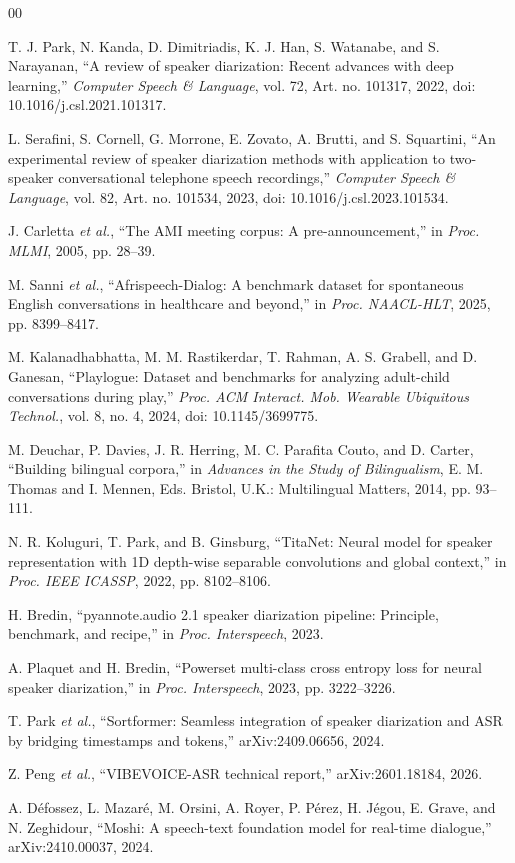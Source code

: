\documentclass[conference,onecolumn]{IEEEtran}
\begin{document}
\begin{thebibliography}{00}

T. J. Park, N. Kanda, D. Dimitriadis, K. J. Han, S. Watanabe, and S. Narayanan,
``A review of speaker diarization: Recent advances with deep learning,''
\emph{Computer Speech \& Language}, vol. 72, Art. no. 101317, 2022,
doi: 10.1016/j.csl.2021.101317.

L. Serafini, S. Cornell, G. Morrone, E. Zovato, A. Brutti, and S. Squartini,
``An experimental review of speaker diarization methods with application to
two-speaker conversational telephone speech recordings,'' \emph{Computer
Speech \& Language}, vol. 82, Art. no. 101534, 2023,
doi: 10.1016/j.csl.2023.101534.

J. Carletta \emph{et al.}, ``The AMI meeting corpus: A pre-announcement,'' in
\emph{Proc. MLMI}, 2005, pp. 28--39.

M. Sanni \emph{et al.}, ``Afrispeech-Dialog: A benchmark dataset for
spontaneous English conversations in healthcare and beyond,'' in \emph{Proc.
NAACL-HLT}, 2025, pp. 8399--8417.

M. Kalanadhabhatta, M. M. Rastikerdar, T. Rahman, A. S. Grabell, and D. Ganesan,
``Playlogue: Dataset and benchmarks for analyzing adult-child conversations
during play,'' \emph{Proc. ACM Interact. Mob. Wearable Ubiquitous Technol.},
vol. 8, no. 4, 2024, doi: 10.1145/3699775.

M. Deuchar, P. Davies, J. R. Herring, M. C. Parafita Couto, and D. Carter,
``Building bilingual corpora,'' in \emph{Advances in the Study of
Bilingualism}, E. M. Thomas and I. Mennen, Eds. Bristol, U.K.: Multilingual
Matters, 2014, pp. 93--111.

N. R. Koluguri, T. Park, and B. Ginsburg, ``TitaNet: Neural model for speaker
representation with 1D depth-wise separable convolutions and global context,''
in \emph{Proc. IEEE ICASSP}, 2022, pp. 8102--8106.

H. Bredin, ``pyannote.audio 2.1 speaker diarization pipeline: Principle,
benchmark, and recipe,'' in \emph{Proc. Interspeech}, 2023.

A. Plaquet and H. Bredin, ``Powerset multi-class cross entropy loss for neural
speaker diarization,'' in \emph{Proc. Interspeech}, 2023, pp. 3222--3226.

T. Park \emph{et al.}, ``Sortformer: Seamless integration of speaker
diarization and ASR by bridging timestamps and tokens,'' arXiv:2409.06656,
2024.

Z. Peng \emph{et al.}, ``VIBEVOICE-ASR technical report,'' arXiv:2601.18184,
2026.

A. D\'efossez, L. Mazar\'e, M. Orsini, A. Royer, P. P\'erez, H. J\'egou,
E. Grave, and N. Zeghidour, ``Moshi: A speech-text foundation model for
real-time dialogue,'' arXiv:2410.00037, 2024.

\end{thebibliography}
\end{document}
